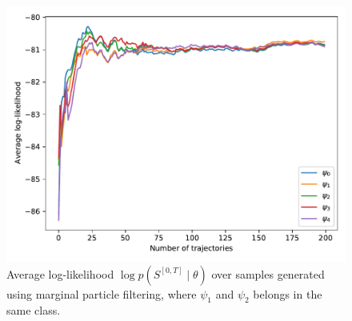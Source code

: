 \begin{figure}[t]
	\begin{center}
		\includegraphics[width=.7\textwidth]{figures/equivalence_classes/llh_particleFilter_sameclass}
		\caption[An equivalence class in the case of marginal particle filtering]{Average log-likelihood $ \log p(S^{[0,T]} \mid \theta) $ over samples generated using marginal particle filtering, where $ \psi_1 $ and $ \psi_2 $ belongs in the same class.}
		\label{fig:llh_particleFilter_sameclass}
	\end{center}
\end{figure} 
